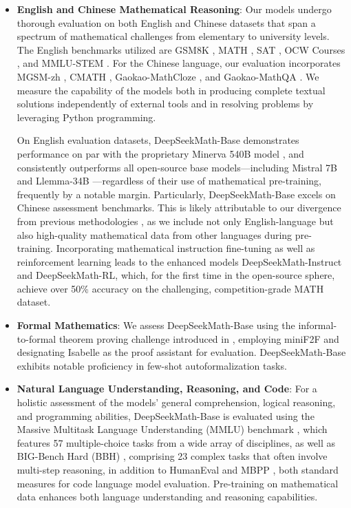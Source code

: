 \begin{itemize}[topsep=0pt]
    \item \textbf{English and Chinese Mathematical Reasoning}: Our models undergo thorough evaluation on both English and Chinese datasets that span a spectrum of mathematical challenges from elementary to university levels. The English benchmarks utilized are GSM8K \citep{gsm8k}, MATH \citep{MATH}, SAT \citep{llemma}, OCW Courses \citep{minerva}, and MMLU-STEM \citep{mmlu}. For the Chinese language, our evaluation incorporates MGSM-zh \citep{mgsm}, CMATH \citep{wei2023cmath}, Gaokao-MathCloze \citep{agieval}, and Gaokao-MathQA \citep{agieval}. We measure the capability of the models both in producing complete textual solutions independently of external tools and in resolving problems by leveraging Python programming.

On English evaluation datasets, DeepSeekMath-Base demonstrates performance on par with the proprietary Minerva 540B model \citep{minerva}, and consistently outperforms all open-source base models—including Mistral 7B \citep{mistral} and Llemma-34B \citep{llemma}—regardless of their use of mathematical pre-training, frequently by a notable margin. Particularly, DeepSeekMath-Base excels on Chinese assessment benchmarks. This is likely attributable to our divergence from previous methodologies \citep{minerva,llemma}, as we include not only English-language but also high-quality mathematical data from other languages during pre-training. Incorporating mathematical instruction fine-tuning as well as reinforcement learning leads to the enhanced models DeepSeekMath-Instruct and DeepSeekMath-RL, which, for the first time in the open-source sphere, achieve over 50\% accuracy on the challenging, competition-grade MATH dataset.

\item \textbf{Formal Mathematics}: We assess DeepSeekMath-Base using the informal-to-formal theorem proving challenge introduced in \citep{dsp_proof}, employing miniF2F \citep{minif2f} and designating Isabelle \citep{isabelle} as the proof assistant for evaluation. DeepSeekMath-Base exhibits notable proficiency in few-shot autoformalization tasks.
\item \textbf{Natural Language Understanding, Reasoning, and Code}: For a holistic assessment of the models’ general comprehension, logical reasoning, and programming abilities, DeepSeekMath-Base is evaluated using the Massive Multitask Language Understanding (MMLU) benchmark \citep{mmlu}, which features 57 multiple-choice tasks from a wide array of disciplines, as well as BIG-Bench Hard (BBH) \citep{bbh}, comprising 23 complex tasks that often involve multi-step reasoning, in addition to HumanEval \citep{codex} and MBPP \citep{mbpp}, both standard measures for code language model evaluation. Pre-training on mathematical data enhances both language understanding and reasoning capabilities.


\end{itemize}
